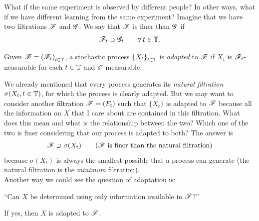 \documentclass{report}
\begin{document}
\begin{example}
	What if the same experiment is observed by different people? In other ways, what if we have different learning from the same experiment? Imagine that we have two filtrations $\mathscr{F}$ and $\mathscr{G}$. We say that $\mathscr{F}$ is finer than $\mathscr{G}$ if
	\[\mathscr{F}_t\supset\mathscr{G}_t\qquad\forall\, t\in\mathbb{T}.\]
\end{example}
\begin{definition}
	Given $\mathscr{F}={(\mathscr{F}_t)}_{t\in\mathbb{T}}$, a stochastic process ${\{X_t\}}_{t\in\mathbb{T}}$ is \emph{adapted} to $\mathscr{F}$ if $X_{t}$ is $\mathscr{F}_t$-neasurable for each $t\in\mathbb{T}$ and $\mathscr{E}$-measurable.
\end{definition}
We already mentioned that every process generates its \textit{natural filtration} $\sigma(X_{t},t\in\mathbb{T})$, for which the process is clearly adapted. But we may want to consider another filtration $\mathscr{F}=(F_t)$ such that $\{X_t\}$ is adapted to $\mathscr{F}$ because all the information on $X$ that I care about are contained in this filtration. What does this mean and what  is the relationship between the two? Which one of the two is finer considering that our process is adapted to both? The answer is 
\[\mathscr{F}\supset\sigma(X_t)\qquad\text{($\mathscr{F}$ is finer than the natural filtration)}\]
because $\sigma(X_t)$ is always the smallest possible \sa{} that a process can generate (the natural filtration is the \textit{minimum} filtration). \\
Another way we could see the question of adaptation is:
\begin{center}
	``Can $X$ be determined using only information available in $\mathscr{F}$?''
\end{center}
If yes, then $X$ is adapted to $\mathscr{F}$.
\end{document}

